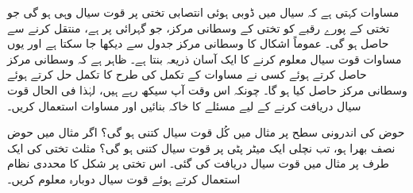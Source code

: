
مساوات  کہتی ہے کہ سیال میں ڈوبی  ہوئی انتصابی تختی پر قوت سیال وہی ہو گی   جو تختی کے پورے رقبے کو تختی کے وسطانی مرکز، جو  گہرائی پر ہے، منتقل کرنے سے  حاصل ہو گی۔ عموماً اشکال کا وسطانی مرکز جدول سے دیکھا جا سکتا ہے اور یوں مساوات  قوت سیال معلوم کرنے کا ایک آسان ذریعہ بنتا ہے۔ ظاہر ہے کہ وسطانی مرکز حاصل کرتے ہوئے کسی نے   مساوات  کے تکمل کی طرح کا تکمل حل کرتے ہوئے وسطانی مرکز حاصل کیا ہو گا۔ چونکہ اس وقت آپ سیکھ رہے ہیں، لہٰذا فی الحال قوت سیال دریافت کرنے کے لیے مسئلے کا خاکہ بنائیں اور مساوات  استعمال کریں۔

حوض کی اندرونی سطح  پر مثال  میں  کُل قوت سیال کتنی   ہو گی؟
اگر مثال  میں حوض نصف بھرا ہو، تب نچلی ایک میٹر پٹی پر قوت سیال کتنی ہو گی؟
مثلث تختی کی ایک طرف پر مثال  میں قوت سیال دریافت کی گئی۔ اس تختی پر شکل  کا محددی نظام استعمال کرتے ہوئے قوت سیال دوبارہ معلوم کریں۔ 
